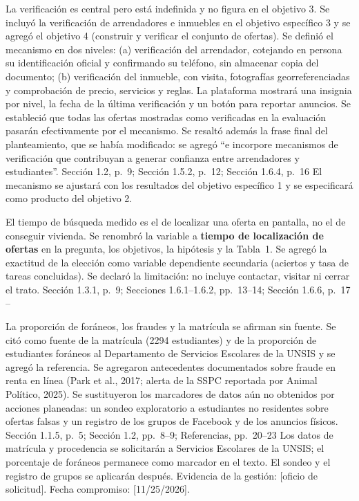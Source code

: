 \documentclass[10pt]{article}
\begin{document}
\begin{matriz}
  {La verificación es central pero está indefinida y no figura en el objetivo 3.}
  {Se incluyó la verificación de arrendadores e inmuebles en el objetivo específico 3 y se agregó el objetivo 4 (construir y verificar el conjunto de ofertas).\newline
   Se definió el mecanismo en dos niveles: (a) verificación del arrendador, cotejando en persona su identificación oficial y confirmando su teléfono, sin almacenar copia del documento; (b) verificación del inmueble, con visita, fotografías georreferenciadas y comprobación de precio, servicios y reglas. La plataforma mostrará una insignia por nivel, la fecha de la última verificación y un botón para reportar anuncios.\newline
   Se estableció que todas las ofertas mostradas como verificadas en la evaluación pasarán efectivamente por el mecanismo.\newline
   Se resaltó además la frase final del planteamiento, que se había modificado: se agregó ``e incorpore mecanismos de verificación que contribuyan a generar confianza entre arrendadores y estudiantes''.}
  {Sección 1.2, p.~9; Sección 1.5.2, p.~12; Sección 1.6.4, p.~16}
  {\Atendida}
  {El mecanismo se ajustará con los resultados del objetivo específico 1 y se especificará como producto del objetivo 2.}
  {}

  {El tiempo de búsqueda medido es el de localizar una oferta en pantalla, no el de conseguir vivienda.}
  {Se renombró la variable a \textbf{tiempo de localización de ofertas} en la pregunta, los objetivos, la hipótesis y la Tabla~1.\newline
   Se agregó la exactitud de la elección como variable dependiente secundaria (aciertos y tasa de tareas concluidas).\newline
   Se declaró la limitación: no incluye contactar, visitar ni cerrar el trato.}
  {Sección 1.3.1, p.~9; Secciones 1.6.1--1.6.2, pp.~13--14; Sección 1.6.6, p.~17}
  {\Atendida}{--}{}

  {La proporción de foráneos, los fraudes y la matrícula se afirman sin fuente.}
  {Se citó como fuente de la matrícula (2294 estudiantes) y de la proporción de estudiantes foráneos al Departamento de Servicios Escolares de la UNSIS y se agregó la referencia.\newline
   Se agregaron antecedentes documentados sobre fraude en renta en línea (Park et al., 2017; alerta de la SSPC reportada por Animal Político, 2025).\newline
   Se sustituyeron los marcadores de datos aún no obtenidos por acciones planeadas: un sondeo exploratorio a estudiantes no residentes sobre ofertas falsas y un registro de los grupos de Facebook y de los anuncios físicos.}
  {Sección 1.1.5, p.~5; Sección 1.2, pp.~8--9; Referencias, pp.~20--23}
  {\Pendiente}
  {Los datos de matrícula y procedencia se solicitarán a Servicios Escolares de la UNSIS; el porcentaje de foráneos permanece como marcador en el texto. El sondeo y el registro de grupos se aplicarán después. Evidencia de la gestión: [oficio de solicitud]. Fecha compromiso: [11/25/2026].}
  {}


\end{matriz}
\end{document}
